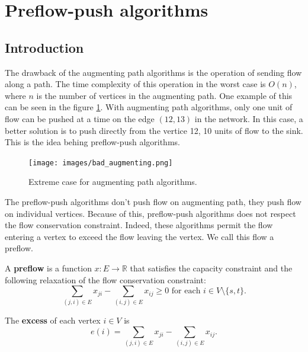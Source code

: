 \section{Preflow-push algorithms}
\label{sec:preflow}

\subsection{Introduction}

The drawback of the augmenting path algorithms is the operation of sending flow along a path. The time complexity of this operation in the worst case is $O(n)$, where $n$ is the number of vertices in the augmenting path. One example of this  can be seen in the figure \ref{img:bad_augmenting}. With augmenting path algorithms, only one unit of flow can be pushed at a time on the edge $(12, 13)$ in the network. In this case, a better solution is to push directly from the vertice 12, 10 units of flow to the sink. This is the idea behing preflow-push algorithms.

\begin{figure}[H]
\centering
\texttt{[image: images/bad\_augmenting.png]}
\caption{Extreme case for augmenting path algorithms.}
\label{img:bad_augmenting}
\end{figure}

The preflow-push algorithms don't push flow on augmenting path, they push flow on individual vertices. Because of this, preflow-push algorithms does not respect the flow conservation constraint. Indeed, these algorithms permit the flow entering a vertex to exceed the flow leaving the vertex. We call this flow a preflow.

\begin{definition}
\label{preflow}
A \textbf{preflow} is a function $x: E \to \mathbb{R}$ that satisfies the capacity constraint and the following relaxation of the flow conservation constraint:
$$\sum\limits_{(j,i) \in E} x_{ji} - \sum\limits_{(i,j) \in E} x_{ij} \geq 0 \text{	for each } i \in V \setminus \{s, t\}.$$
\end{definition}

\begin{definition}
\label{excess}
The \textbf{excess} of each vertex $i \in V$ is 
$$e(i) = \sum\limits_{(j,i) \in E} x_{ji} - \sum\limits_{(i,j) \in E} x_{ij}.$$
\end{definition}

